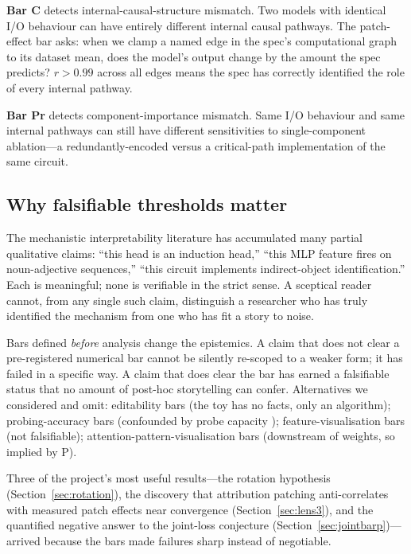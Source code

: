 \documentclass[11pt,letterpaper]{article}
\begin{document}
\textbf{Bar C} detects internal-causal-structure mismatch. Two models with identical I/O behaviour can have entirely different internal causal pathways. The patch-effect bar asks: when we clamp a named edge in the spec's computational graph to its dataset mean, does the model's output change by the amount the spec predicts? $r > 0.99$ across all edges means the spec has correctly identified the role of every internal pathway.

\textbf{Bar Pr} detects component-importance mismatch. Same I/O behaviour and same internal pathways can still have different sensitivities to single-component ablation---a redundantly-encoded versus a critical-path implementation of the same circuit.

\subsection{Why falsifiable thresholds matter}

The mechanistic interpretability literature has accumulated many partial qualitative claims: ``this head is an induction head,'' ``this MLP feature fires on noun-adjective sequences,'' ``this circuit implements indirect-object identification.'' Each is meaningful; none is verifiable in the strict sense. A sceptical reader cannot, from any single such claim, distinguish a researcher who has truly identified the mechanism from one who has fit a story to noise.

Bars defined \emph{before} analysis change the epistemics. A claim that does not clear a pre-registered numerical bar cannot be silently re-scoped to a weaker form; it has failed in a specific way. A claim that does clear the bar has earned a falsifiable status that no amount of post-hoc storytelling can confer. Alternatives we considered and omit: editability bars (the toy has no facts, only an algorithm); probing-accuracy bars (confounded by probe capacity \citep{hewitt2019designing}); feature-visualisation bars (not falsifiable); attention-pattern-visualisation bars (downstream of weights, so implied by P).

Three of the project's most useful results---the rotation hypothesis (Section~\ref{sec:rotation}), the discovery that attribution patching anti-correlates with measured patch effects near convergence (Section~\ref{sec:lens3}), and the quantified negative answer to the joint-loss conjecture (Section~\ref{sec:jointbarp})---arrived because the bars made failures sharp instead of negotiable.
\end{document}
